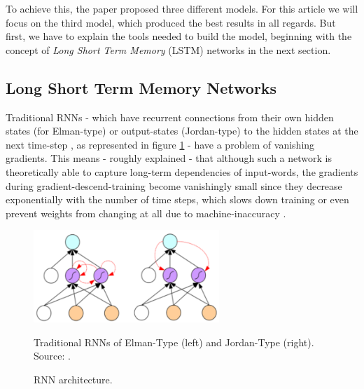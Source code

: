 \documentclass[twoside,11pt,a4paper]{article}
\theoremstyle{break}
\begin{document}
To achieve this, the paper proposed three different models. For this article we will focus on the third model, which produced the best results in all regards. But first, we have to explain the tools needed to build the model, beginning with the concept of \textit{Long Short Term Memory} (LSTM) networks in the next section.

\subsection{Long Short Term Memory Networks}
Traditional RNNs - which have recurrent connections from their own hidden states (for Elman-type) or output-states (Jordan-type) to the hidden states at the next time-step \cite{mesnil:2015}, as represented in figure \ref{fig:rnn} - have a problem of vanishing gradients. This means - roughly explained - that although such a network is theoretically able to capture long-term dependencies of input-words, the gradients during gradient-descend-training become vanishingly small since they decrease exponentially with the number of time steps, which slows down training or even prevent weights from changing at all due to machine-inaccuracy \cite{bengio:1994}.

\begin{figure}
	\begin{center}
		\includegraphics[width=7cm]{rnn.png}
		\caption{RNN architecture.}
		Traditional RNNs of Elman-Type (left) and Jordan-Type (right). Source: \cite{mesnil:2015}.
		\label{fig:rnn}
	\end{center}
\end{figure}
\end{document}
